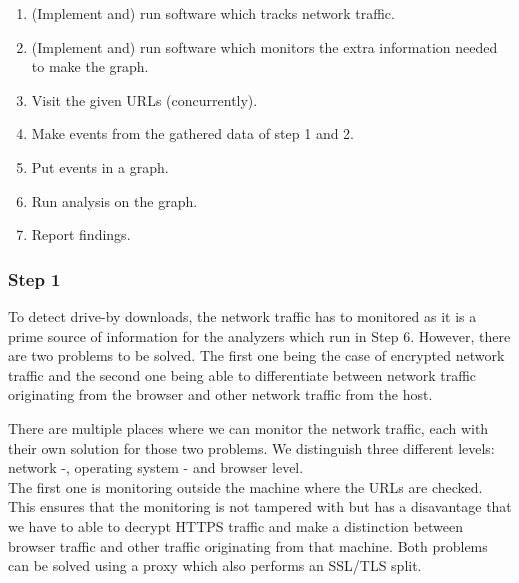\begin{enumerate}
\item (Implement and) run software  which tracks network traffic.
\item (Implement and) run software which monitors the extra information needed to make the graph.
\item Visit the given URLs (concurrently).
\item Make events from the gathered data of step 1 and 2.
\item Put events in a graph.%
\item Run analysis on the graph.
\item Report findings.
\end{enumerate}



\subsubsection{Step 1}

To detect drive-by downloads, the network traffic has to monitored as it is a prime source of information for the analyzers which run in Step 6. However, there are two problems to be solved. The first one being the case of encrypted network traffic and the second one being able to differentiate between network traffic originating from the browser and other network traffic from the host. %

There are multiple places where we can monitor the network traffic, each with their own solution for those two problems. We distinguish three different levels: network -, operating system - and browser level.\\

The first one is monitoring outside the machine where the URLs are checked. This ensures that the monitoring is not tampered with but has a disavantage that we have to able to decrypt HTTPS traffic and make a distinction between browser traffic and other traffic originating from that machine. Both problems can be solved using a proxy which also performs an SSL/TLS split.\\

